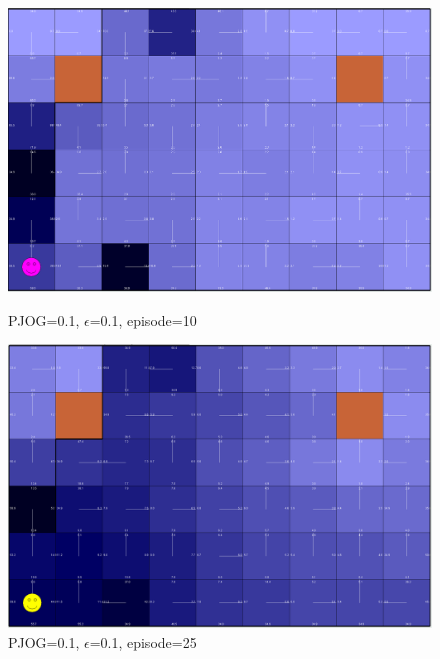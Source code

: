 \documentclass[11pt]{article}
\begin{document}
\begin{figure}[!htb]
   \begin{minipage}{0.34\textwidth}
     \centering
     \includegraphics[width=1.2\linewidth]{../figures/q1_1_10.png}
     \caption{PJOG=0.1, $\epsilon$=0.1, episode=10}\label{Fig:q1_1_10}
   \end{minipage}\hfill
   \begin{minipage}{0.34\textwidth}
     \centering
     \includegraphics[width=1.2\linewidth]{../figures/q1_1_25.png}
     \caption{PJOG=0.1, $\epsilon$=0.1, episode=25}\label{Fig:q1_1_25}
   \end{minipage}
\end{figure}
\end{document}
